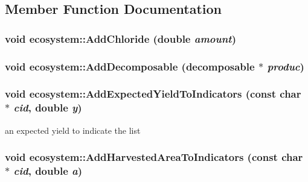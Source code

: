 \subsection{Member Function Documentation}
\hypertarget{classecosystem_a963c60e4ca14481915f72ff7cfbe7eaf}{
\subsubsection[{AddChloride}]{\setlength{\rightskip}{0pt plus 5cm}void ecosystem::AddChloride (double {\em amount})}}
\label{classecosystem_a963c60e4ca14481915f72ff7cfbe7eaf}
\hypertarget{classecosystem_aa3bf9115a761ece998311118bfad8973}{
\subsubsection[{AddDecomposable}]{\setlength{\rightskip}{0pt plus 5cm}void ecosystem::AddDecomposable ({\bf decomposable} $\ast$ {\em produc})}}
\label{classecosystem_aa3bf9115a761ece998311118bfad8973}
\hypertarget{classecosystem_ae1107288d1b4c6749be48752cd319487}{
\subsubsection[{AddExpectedYieldToIndicators}]{\setlength{\rightskip}{0pt plus 5cm}void ecosystem::AddExpectedYieldToIndicators (const char $\ast$ {\em cid}, \/  double {\em y})}}
\label{classecosystem_ae1107288d1b4c6749be48752cd319487}


an expected yield to indicate the list \hypertarget{classecosystem_abc7a644bdde090e99a70f5a34d6dfe8b}{
\subsubsection[{AddHarvestedAreaToIndicators}]{\setlength{\rightskip}{0pt plus 5cm}void ecosystem::AddHarvestedAreaToIndicators (const char $\ast$ {\em cid}, \/  double {\em a})}}
\label{classecosystem_abc7a644bdde090e99a70f5a34d6dfe8b}


